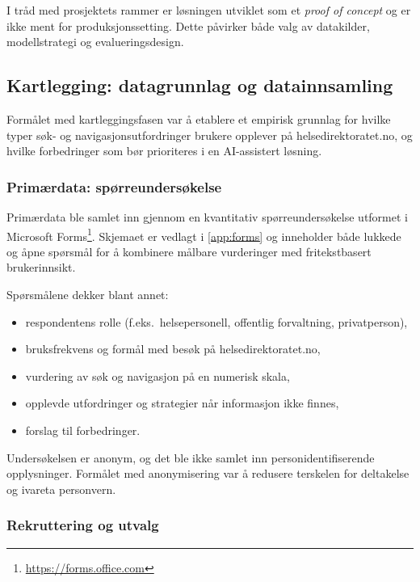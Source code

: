 I tråd med prosjektets rammer er løsningen utviklet som et \textit{proof of concept} og er ikke ment for produksjonssetting. Dette påvirker både valg av datakilder, modellstrategi og evalueringsdesign. \cite{ProjectPlan}

\subsection{Kartlegging: datagrunnlag og datainnsamling}
\label{sec:kartlegging}

Formålet med kartleggingsfasen var å etablere et empirisk grunnlag for hvilke typer søk- og navigasjonsutfordringer brukere opplever på helsedirektoratet.no, og hvilke forbedringer som bør prioriteres i en AI-assistert løsning.

\subsubsection{Primærdata: spørreundersøkelse}
\label{sec:survey}

Primærdata ble samlet inn gjennom en kvantitativ spørreundersøkelse utformet i Microsoft Forms\footnote{\url{https://forms.office.com}}. Skjemaet er vedlagt i \autoref{app:forms} og inneholder både lukkede og åpne spørsmål for å kombinere målbare vurderinger med fritekstbasert brukerinnsikt.

Spørsmålene dekker blant annet:
\begin{itemize}
    \item respondentens rolle (f.eks.\ helsepersonell, offentlig forvaltning, privatperson),
    \item bruksfrekvens og formål med besøk på helsedirektoratet.no,
    \item vurdering av søk og navigasjon på en numerisk skala,
    \item opplevde utfordringer og strategier når informasjon ikke finnes,
    \item forslag til forbedringer.
\end{itemize}

Undersøkelsen er anonym, og det ble ikke samlet inn personidentifiserende opplysninger. Formålet med anonymisering var å redusere terskelen for deltakelse og ivareta personvern.

\subsubsection{Rekruttering og utvalg}
\label{sec:utvalg}

